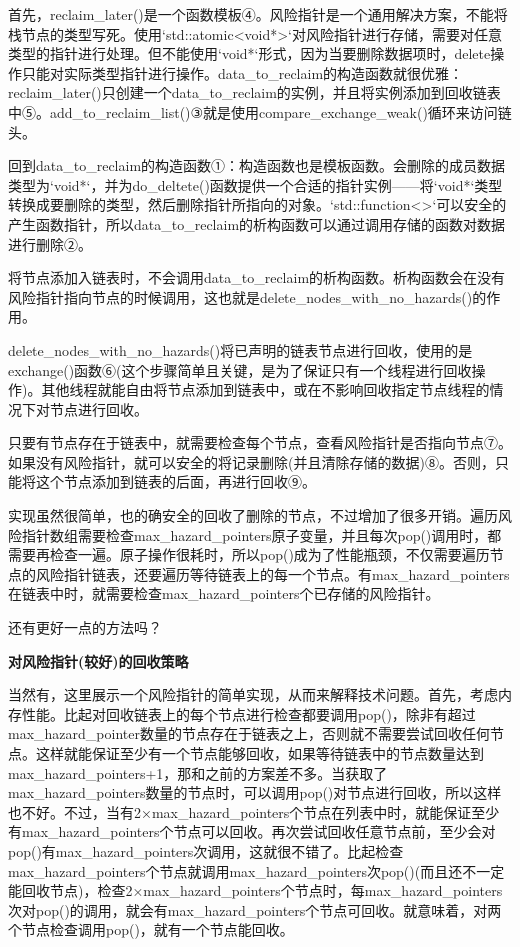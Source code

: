 首先，reclaim\_later()是一个函数模板④。风险指针是一个通用解决方案，不能将栈节点的类型写死。使用`std::atomic<void*>`对风险指针进行存储，需要对任意类型的指针进行处理。但不能使用`void*`形式，因为当要删除数据项时，delete操作只能对实际类型指针进行操作。data\_to\_reclaim的构造函数就很优雅：reclaim\_later()只创建一个data\_to\_reclaim的实例，并且将实例添加到回收链表中⑤。add\_to\_reclaim\_list()③就是使用compare\_exchange\_weak()循环来访问链头。

回到data\_to\_reclaim的构造函数①：构造函数也是模板函数。会删除的成员数据类型为`void*`，并为do\_deltete()函数提供一个合适的指针实例——将`void*`类型转换成要删除的类型，然后删除指针所指向的对象。`std::function<>`可以安全的产生函数指针，所以data\_to\_reclaim的析构函数可以通过调用存储的函数对数据进行删除②。

将节点添加入链表时，不会调用data\_to\_reclaim的析构函数。析构函数会在没有风险指针指向节点的时候调用，这也就是delete\_nodes\_with\_no\_hazards()的作用。

delete\_nodes\_with\_no\_hazards()将已声明的链表节点进行回收，使用的是exchange()函数⑥(这个步骤简单且关键，是为了保证只有一个线程进行回收操作)。其他线程就能自由将节点添加到链表中，或在不影响回收指定节点线程的情况下对节点进行回收。

只要有节点存在于链表中，就需要检查每个节点，查看风险指针是否指向节点⑦。如果没有风险指针，就可以安全的将记录删除(并且清除存储的数据)⑧。否则，只能将这个节点添加到链表的后面，再进行回收⑨。

实现虽然很简单，也的确安全的回收了删除的节点，不过增加了很多开销。遍历风险指针数组需要检查max\_hazard\_pointers原子变量，并且每次pop()调用时，都需要再检查一遍。原子操作很耗时，所以pop()成为了性能瓶颈，不仅需要遍历节点的风险指针链表，还要遍历等待链表上的每一个节点。有max\_hazard\_pointers在链表中时，就需要检查max\_hazard\_pointers个已存储的风险指针。

还有更好一点的方法吗？

\textbf{对风险指针(较好)的回收策略}

当然有，这里展示一个风险指针的简单实现，从而来解释技术问题。首先，考虑内存性能。比起对回收链表上的每个节点进行检查都要调用pop()，除非有超过max\_hazard\_pointer数量的节点存在于链表之上，否则就不需要尝试回收任何节点。这样就能保证至少有一个节点能够回收，如果等待链表中的节点数量达到max\_hazard\_pointers+1，那和之前的方案差不多。当获取了max\_hazard\_pointers数量的节点时，可以调用pop()对节点进行回收，所以这样也不好。不过，当有2×max\_hazard\_pointers个节点在列表中时，就能保证至少有max\_hazard\_pointers个节点可以回收。再次尝试回收任意节点前，至少会对pop()有max\_hazard\_pointers次调用，这就很不错了。比起检查max\_hazard\_pointers个节点就调用max\_hazard\_pointers次pop()(而且还不一定能回收节点)，检查2×max\_hazard\_pointers个节点时，每max\_hazard\_pointers次对pop()的调用，就会有max\_hazard\_pointers个节点可回收。就意味着，对两个节点检查调用pop()，就有一个节点能回收。

